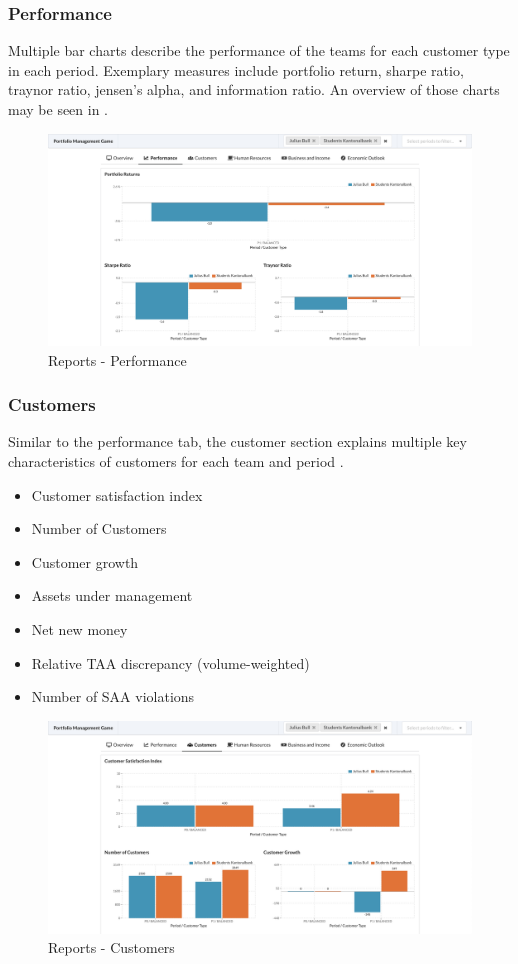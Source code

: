 \subsubsection{Performance}
Multiple bar charts describe the performance of the teams for each customer type in each period. Exemplary measures include portfolio return, sharpe ratio, traynor ratio, jensen's alpha, and information ratio. An overview of those charts may be seen in .
\begin{figure}[h!]
  \centering
  \includegraphics[scale=0.2]{img/application-overview/reports/02_performance.png}
  \caption{Reports - Performance}
  \label{fig:reports_performance}
\end{figure}

\subsubsection{Customers}
Similar to the performance tab, the customer section explains multiple key characteristics of customers for each team and period .
\begin{itemize}
  \setlength\itemsep{0.01em}
  \item Customer satisfaction index
  \item Number of Customers
  \item Customer growth
  \item Assets under management
  \item Net new money
  \item Relative TAA discrepancy (volume-weighted)
  \item Number of SAA violations
\end{itemize}
\begin{figure}[h!]
  \centering
  \includegraphics[scale=0.2]{img/application-overview/reports/03_customers.png}
  \caption{Reports - Customers}
  \label{fig:reports_customers}
\end{figure}

